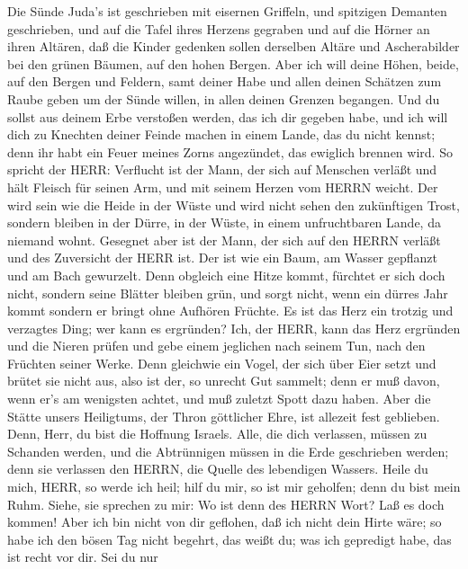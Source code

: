  Die Sünde Juda's ist geschrieben mit eisernen Griffeln, und
spitzigen Demanten geschrieben, und auf die Tafel ihres Herzens gegraben
und auf die Hörner an ihren Altären,  daß die Kinder
gedenken sollen derselben Altäre und Ascherabilder bei den grünen
Bäumen, auf den hohen Bergen.  Aber ich will deine Höhen,
beide, auf den Bergen und Feldern, samt deiner Habe und allen deinen
Schätzen zum Raube geben um der Sünde willen, in allen deinen Grenzen
begangen.  Und du sollst aus deinem Erbe verstoßen werden,
das ich dir gegeben habe, und ich will dich zu Knechten deiner Feinde
machen in einem Lande, das du nicht kennst; denn ihr habt ein Feuer
meines Zorns angezündet, das ewiglich brennen wird.  So
spricht der HERR: Verflucht ist der Mann, der sich auf Menschen verläßt
und hält Fleisch für seinen Arm, und mit seinem Herzen vom HERRN weicht.
 Der wird sein wie die Heide in der Wüste und wird nicht
sehen den zukünftigen Trost, sondern bleiben in der Dürre, in der Wüste,
in einem unfruchtbaren Lande, da niemand wohnt.  Gesegnet
aber ist der Mann, der sich auf den HERRN verläßt und des Zuversicht der
HERR ist.  Der ist wie ein Baum, am Wasser gepflanzt und am
Bach gewurzelt. Denn obgleich eine Hitze kommt, fürchtet er sich doch
nicht, sondern seine Blätter bleiben grün, und sorgt nicht, wenn ein
dürres Jahr kommt sondern er bringt ohne Aufhören Früchte. 
Es ist das Herz ein trotzig und verzagtes Ding; wer kann es ergründen?
 Ich, der HERR, kann das Herz ergründen und die Nieren
prüfen und gebe einem jeglichen nach seinem Tun, nach den Früchten
seiner Werke.  Denn gleichwie ein Vogel, der sich über Eier
setzt und brütet sie nicht aus, also ist der, so unrecht Gut sammelt;
denn er muß davon, wenn er's am wenigsten achtet, und muß zuletzt Spott
dazu haben.  Aber die Stätte unsers Heiligtums, der Thron
göttlicher Ehre, ist allezeit fest geblieben.  Denn, Herr,
du bist die Hoffnung Israels. Alle, die dich verlassen, müssen zu
Schanden werden, und die Abtrünnigen müssen in die Erde geschrieben
werden; denn sie verlassen den HERRN, die Quelle des lebendigen Wassers.
 Heile du mich, HERR, so werde ich heil; hilf du mir, so
ist mir geholfen; denn du bist mein Ruhm.  Siehe, sie
sprechen zu mir: Wo ist denn des HERRN Wort? Laß es doch kommen!
 Aber ich bin nicht von dir geflohen, daß ich nicht dein
Hirte wäre; so habe ich den bösen Tag nicht begehrt, das weißt du; was
ich gepredigt habe, das ist recht vor dir.  Sei du nur

